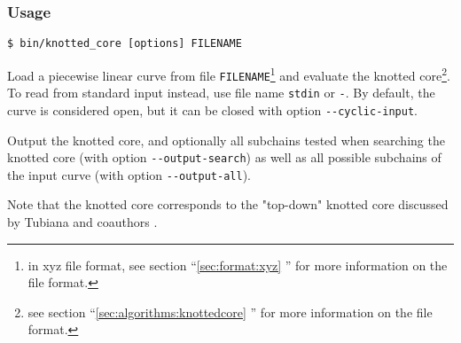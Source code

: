 \subsubsection{Usage}
\begin{lstlisting}
$ bin/knotted_core [options] FILENAME
\end{lstlisting}

Load a piecewise linear curve from file  \lstinline{FILENAME}\footnote{in xyz file format, see section ``\ref{sec:format:xyz} ''  for more information on the file format.} and evaluate the knotted core\footnote{see section  ``\ref{sec:algorithms:knottedcore} '' for more information on the file format.}.
To read from standard input instead, use file name \lstinline{stdin} or \lstinline{-}.
By default, the curve is considered open, but it can be closed with option \lstinline{--cyclic-input}.

Output the knotted core,  and optionally all subchains tested when searching the knotted core (with option \lstinline{--output-search}) as well as all possible subchains of the input curve (with option \lstinline{--output-all}).

Note that the knotted core corresponds to the "top-down" knotted core discussed by Tubiana and coauthors \cite{tubiana2011}.

